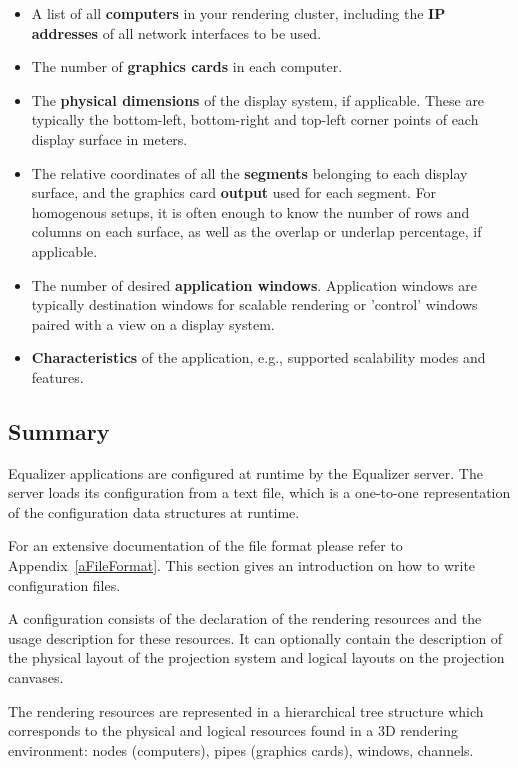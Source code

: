 \documentclass[10pt,a4]{scrartcl}
\newcommand{\aref}[1]{Appendix~\ref{#1}}
\begin{document}
\begin{itemize}
\item A list of all \textbf{computers} in your rendering cluster,
  including the \textbf{IP addresses} of all network interfaces to be
  used.
\item The number of \textbf{graphics cards} in each computer.
\item The \textbf{physical dimensions} of the display system, if
  applicable. These are typically the bottom-left, bottom-right and
  top-left corner points of each display surface in meters.
\item The relative coordinates of all the \textbf{segments} belonging to
  each display surface, and the graphics card \textbf{output} used for
  each segment. For homogenous setups, it is often enough to know the
  number of rows and columns on each surface, as well as the overlap or
  underlap percentage, if applicable.
\item The number of desired \textbf{application windows}. Application
  windows are typically destination windows for scalable rendering or
  'control' windows paired with a view on a display system.
\item \textbf{Characteristics} of the application, e.g., supported
  scalability modes and features.
\end{itemize}

\subsection{Summary}

Equalizer applications are configured at runtime by the Equalizer
server. The server loads its configuration from a text file, which is a
one-to-one representation of the configuration data structures at
runtime.

For an extensive documentation of the file format please refer to
\aref{aFileFormat}. This section gives an introduction on how to write
configuration files.

A configuration consists of the declaration of the rendering resources
and the usage description for these resources. It can optionally contain
the description of the physical layout of the projection system and
logical layouts on the projection canvases.

The rendering resources are represented in a hierarchical tree structure
which corresponds to the physical and logical resources found in a 3D
rendering environment: nodes (computers), pipes (graphics cards),
windows, channels. 
\end{document}

